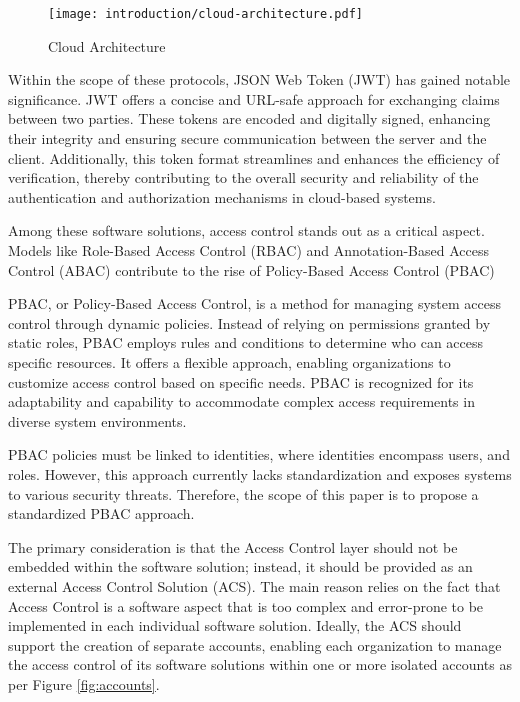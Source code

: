 \begin{figure*}[htbp]
    \centering
    \texttt{[image: introduction/cloud-architecture.pdf]}
    \caption{Cloud Architecture}
    \label{fig:cloud-architecture}
\end{figure*}

Within the scope of these protocols, JSON Web Token (JWT) \cite{c6} has gained notable significance. JWT offers a concise and URL-safe approach for exchanging claims between two parties.
These tokens are encoded and digitally signed, enhancing their integrity and ensuring secure communication between the server and the client.
Additionally, this token format streamlines and enhances the efficiency of verification, thereby contributing to the overall security and reliability of the authentication and authorization mechanisms in cloud-based systems.

Among these software solutions, access control stands out as a critical aspect. Models like Role-Based Access Control (RBAC) and Annotation-Based Access Control (ABAC) contribute to the rise of Policy-Based Access Control (PBAC) \cite{c7}

PBAC, or Policy-Based Access Control, is a method for managing system access control through dynamic policies. Instead of relying on permissions granted by static roles, PBAC employs rules and conditions to determine who can access specific resources. 
It offers a flexible approach, enabling organizations to customize access control based on specific needs. PBAC is recognized for its adaptability and capability to accommodate complex access requirements in diverse system environments.

PBAC policies must be linked to identities, where identities encompass users, and roles. However, this approach currently lacks standardization and exposes systems to various security threats.
Therefore, the scope of this paper is to propose a standardized PBAC approach.

The primary consideration is that the Access Control layer should not be embedded within the software solution; instead, it should be provided as an external Access Control Solution (ACS). 
The main reason relies on the fact that Access Control is a software aspect that is too complex and error-prone to be implemented in each individual software solution.
Ideally, the ACS should support the creation of separate accounts, enabling each organization to manage the access control of its software solutions within one or more isolated accounts as per Figure \ref{fig:accounts}.

